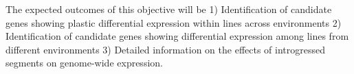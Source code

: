 The expected outcomes of this objective will be 1) Identification of candidate genes showing plastic differential expression within lines across environments 2) Identification of candidate genes showing differential expression among lines from different environments 3) Detailed information on the effects of introgressed segments on genome-wide expression. 



